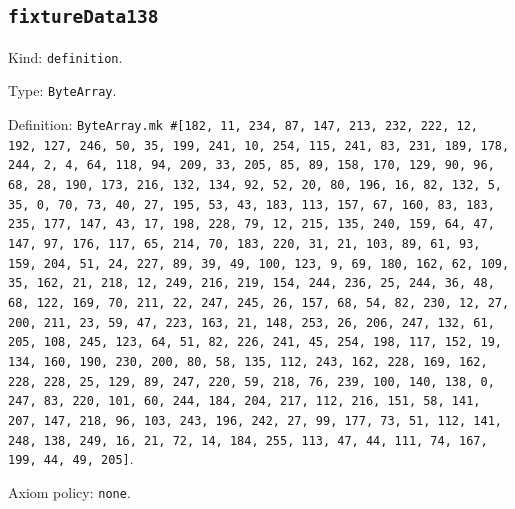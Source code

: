 \documentclass[11pt]{article}
\begin{document}
\subsection*{\texttt{fixtureData138}}
\noindent Kind: \texttt{definition}.\par
\noindent Type: \texttt{ByteArray}.\par
\noindent Definition: \texttt{ByteArray.mk \#[182, 11, 234, 87, 147, 213, 232, 222, 12, 192, 127, 246, 50, 35, 199, 241, 10, 254, 115, 241, 83, 231, 189, 178, 244, 2, 4, 64, 118, 94, 209, 33, 205, 85, 89, 158, 170, 129, 90, 96, 68, 28, 190, 173, 216, 132, 134, 92, 52, 20, 80, 196, 16, 82, 132, 5, 35, 0, 70, 73, 40, 27, 195, 53, 43, 183, 113, 157, 67, 160, 83, 183, 235, 177, 147, 43, 17, 198, 228, 79, 12, 215, 135, 240, 159, 64, 47, 147, 97, 176, 117, 65, 214, 70, 183, 220, 31, 21, 103, 89, 61, 93, 159, 204, 51, 24, 227, 89, 39, 49, 100, 123, 9, 69, 180, 162, 62, 109, 35, 162, 21, 218, 12, 249, 216, 219, 154, 244, 236, 25, 244, 36, 48, 68, 122, 169, 70, 211, 22, 247, 245, 26, 157, 68, 54, 82, 230, 12, 27, 200, 211, 23, 59, 47, 223, 163, 21, 148, 253, 26, 206, 247, 132, 61, 205, 108, 245, 123, 64, 51, 82, 226, 241, 45, 254, 198, 117, 152, 19, 134, 160, 190, 230, 200, 80, 58, 135, 112, 243, 162, 228, 169, 162, 228, 228, 25, 129, 89, 247, 220, 59, 218, 76, 239, 100, 140, 138, 0, 247, 83, 220, 101, 60, 244, 184, 204, 217, 112, 216, 151, 58, 141, 207, 147, 218, 96, 103, 243, 196, 242, 27, 99, 177, 73, 51, 112, 141, 248, 138, 249, 16, 21, 72, 14, 184, 255, 113, 47, 44, 111, 74, 167, 199, 44, 49, 205]}.\par
\noindent Axiom policy: \texttt{none}.\par
\end{document}

